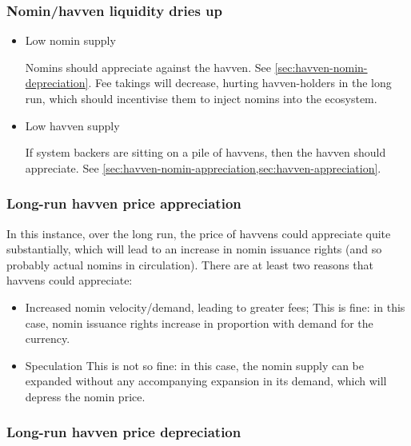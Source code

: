\subsubsection{Nomin/havven liquidity dries up}
\begin{itemize}
	\item Low nomin supply

	Nomins should appreciate against the havven. See \cref{sec:havven-nomin-depreciation}.
	Fee takings will decrease, hurting havven-holders in the long run,
	which should incentivise them to inject nomins into the ecosystem.

	\item Low havven supply

	If system backers are sitting on a pile of havvens, then the havven should
	appreciate. See \cref{sec:havven-nomin-appreciation,sec:havven-appreciation}.
\end{itemize}


\subsubsection{Long-run havven price appreciation}\label{sec:havven-appreciation}
In this instance, over the long run, the price of havvens could appreciate quite substantially,
which will lead to an increase in nomin issuance rights (and so probably actual nomins in circulation).
There are at least two reasons that havvens could appreciate:
\begin{itemize}
	\item Increased nomin velocity/demand, leading to greater fees;
	This is fine: in this case, nomin issuance rights increase in proportion with demand for the currency.

	\item Speculation
	This is not so fine: in this case, the nomin supply can be expanded without any accompanying
	expansion in its demand, which will depress the nomin price.
\end{itemize}

\subsubsection{Long-run havven price depreciation}\label{sec:havven-depreciation}

